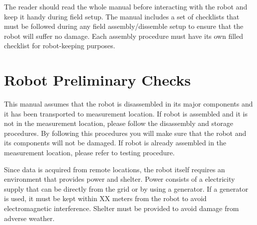 \documentclass{article}
\begin{document}
The reader should read the whole manual before interacting with the robot and keep it handy during field setup. The manual includes a set of checklists that must be followed during any field assembly/dissemble setup to ensure that the robot will suffer no damage. Each assembly procedure must have its own filled checklist for robot-keeping purposes.

\newpage
\section{Robot Preliminary Checks}
This manual assumes that the robot is disassembled in its major components and it has been transported to measurement location. If robot is assembled and it is not in the measurement location, please follow the disassembly and storage procedures. By following this procedures you will make sure that the robot and its components will not be damaged. If robot is already assembled in the measurement location, please refer to testing procedure.

Since data is acquired from remote locations, the robot itself requires an environment that provides power and shelter. Power consists of a electricity supply that can be directly from the grid or by using a generator. If a generator is used, it must be kept within XX meters from the robot to avoid electromagnetic interference. Shelter must be provided to avoid damage from adverse weather. 
\end{document}
